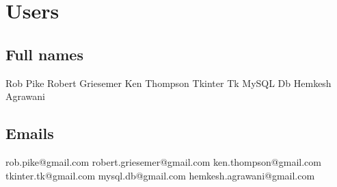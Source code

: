 \documentclass{article}%
\begin{document}
%
\normalsize%
\section{Users}%
\subsection{Full names}%
Rob Pike\newline%
%
Robert Griesemer\newline%
%
Ken Thompson\newline%
%
Tkinter Tk\newline%
%
MySQL Db\newline%
%
Hemkesh Agrawani\newline%

%
\subsection{Emails}%
rob.pike@gmail.com\newline%
%
robert.griesemer@gmail.com\newline%
%
ken.thompson@gmail.com\newline%
%
tkinter.tk@gmail.com\newline%
%
mysql.db@gmail.com\newline%
%
hemkesh.agrawani@gmail.com\newline%

%
\end{document}
